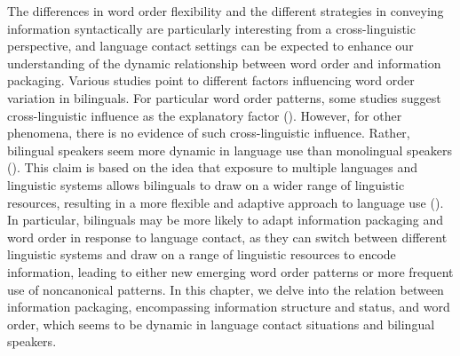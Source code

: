 \documentclass[output=paper,colorlinks,citecolor=brown]{langscibook}
\begin{document}
The differences in word order flexibility and the different strategies in conveying information syntactically are particularly interesting from a cross-linguistic perspective, and language contact settings can be expected to enhance our understanding of the dynamic relationship between word order and information packaging. Various studies point to different factors influencing word order variation in bilinguals. For particular word order patterns, some studies suggest cross-linguistic influence as the explanatory factor (\cite{polinsky_heritage_2018}). However, for other phenomena, there is no evidence of such cross-linguistic influence. Rather, bilingual speakers seem more dynamic in language use than monolingual speakers (\cite{wiese_heritage_2022}). This claim is based on the idea that exposure to multiple languages and linguistic systems allows bilinguals to draw on a wider range of linguistic resources, resulting in a more flexible and adaptive approach to language use (\cite{WieseHeike2016Cinu}). In particular, bilinguals may be more likely to adapt information packaging and word order in response to language contact, as they can switch between different linguistic systems and draw on a range of linguistic resources to encode information, leading to either new emerging word order patterns or more frequent use of noncanonical patterns. In this chapter, we delve into the relation between information packaging, encompassing information structure and status, and word order, which seems to be dynamic in language contact situations and bilingual speakers.
\end{document}
